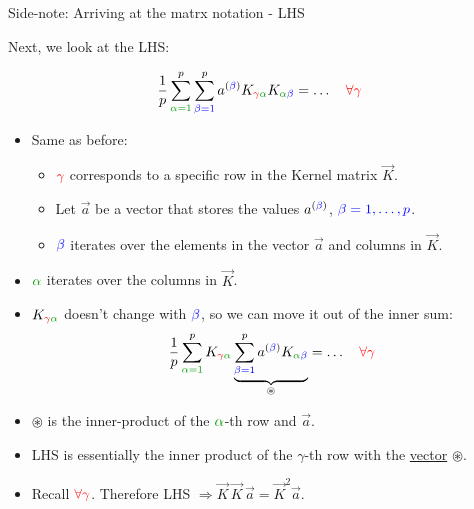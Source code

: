 
\begin{frame}{Side-note: Arriving at the matrx notation - LHS}

Next, we look at the LHS:

\svspace{-3mm}

\begin{equation}
 \frac{1}{p} \sum_{{\color{darkgreen}\alpha=1}}^{p} \sum^{p}_{{\color{blue}\beta=1}} 
a^{({\color{blue}\beta})}
K_{{\color{red}\gamma} {\color{darkgreen}\alpha}}
K_{{\color{darkgreen}\alpha} {\color{blue}\beta}} = \ldots
 \quad {\color{red}\forall \gamma}
\end{equation}

\svspace{-1mm}

\begin{itemize}
\item Same as before:
\begin{itemize}
\item ${\color{red}\gamma}$ corresponds to a specific row in the Kernel matrix $\vec K$.
\item Let $\vec a$ be a vector that stores the values $a^{({\color{blue}\beta})}$, ${\color{blue}\beta=1,\ldots,p}$.
\item ${\color{blue}\beta}$ iterates over the elements in the vector $\vec a$ and columns in $\vec K$.
\end{itemize}
\item ${\color{darkgreen}\alpha}$ iterates over the columns in $\vec K$.
\item $K_{{\color{red}\gamma} {\color{darkgreen}\alpha}}$ doesn't change with ${\color{blue}\beta}$, so we can move it out of the inner sum:
\svspace{-3mm}
\begin{align}
 \frac{1}{p} \sum_{{\color{darkgreen}\alpha=1}}^{p} 
 K_{{\color{red}\gamma} {\color{darkgreen}\alpha}}
 \underbrace{
\sum^{p}_{{\color{blue}\beta=1}} 
a^{({\color{blue}\beta})}
K_{{\color{darkgreen}\alpha} {\color{blue}\beta}}}_{\circledast} = \ldots
 \quad {\color{red}\forall \gamma}
\end{align}
\item $\circledast$ is the inner-product of the ${\color{darkgreen}\alpha}$-th row and $\vec a$.
\item LHS is essentially the inner product of the $\gamma$-th row with the \underline{vector} $\circledast$.
\item Recall ${\color{red}\forall \gamma}$. Therefore LHS $\Rightarrow \vec K \, \vec K \, \vec a = \vec K^2 \vec a$.  

\end{itemize}

\end{frame}

